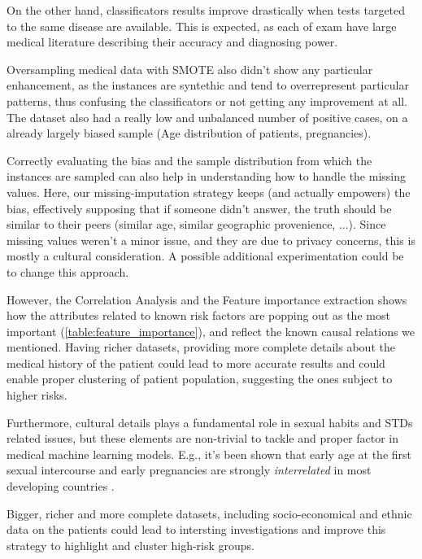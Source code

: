On the other hand, classificators results improve drastically when tests targeted to the same disease are available. This is expected, as each of exam have large medical literature describing their accuracy and diagnosing power.

Oversampling medical data with SMOTE also didn't show any particular enhancement, as the instances are syntethic and tend to overrepresent particular patterns, thus confusing the classificators or not getting any improvement at all. The dataset also had a really low and unbalanced number of positive cases, on a already largely biased sample (Age distribution of patients, pregnancies).

Correctly evaluating the bias and the sample distribution from which the instances are sampled can also help in understanding how to handle the missing values. Here, our missing-imputation strategy keeps (and actually empowers) the bias, effectively supposing that if someone didn't answer, the truth should be similar to their peers (similar age, similar geographic provenience, ...). Since missing values weren't a minor issue, and they are due to privacy concerns, this is mostly a cultural consideration. A possible additional experimentation could be to change this approach.

However, the Correlation Analysis and the Feature importance extraction shows how the attributes related to known risk factors are popping out as the most important (\ref{table:feature_importance}), and reflect the known causal relations we mentioned. Having richer datasets, providing more complete details about the medical history of the patient could lead to more accurate results and could enable proper clustering of patient population, suggesting the ones subject to higher risks.

Furthermore, cultural details plays a fundamental role in sexual habits and STDs related issues, but these elements are non-trivial to tackle and proper factor in medical machine learning models. E.g., it's been shown that early age at the first sexual intercourse and early pregnancies are strongly \textit{interrelated} in most developing countries \cite{Louie2009}.

Bigger, richer and more complete datasets, including socio-economical and ethnic data on the patients could lead to intersting investigations and improve this strategy to highlight and cluster high-risk groups.




